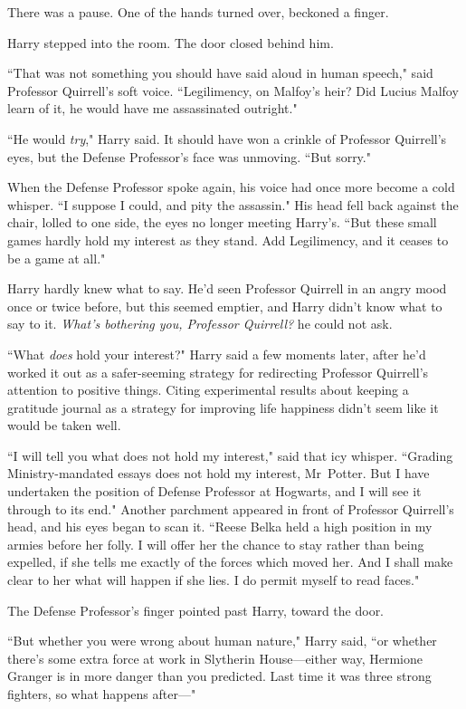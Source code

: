 There was a pause. One of the hands turned over, beckoned a finger.

Harry stepped into the room. The door closed behind him.

``That was not something you should have said aloud in human speech," said Professor Quirrell's soft voice. ``Legilimency, on Malfoy's heir? Did Lucius Malfoy learn of it, he would have me assassinated outright."

``He would \emph{try}," Harry said. It should have won a crinkle of Professor Quirrell's eyes, but the Defense Professor's face was unmoving. ``But sorry."

When the Defense Professor spoke again, his voice had once more become a cold whisper. ``I suppose I could, and pity the assassin." His head fell back against the chair, lolled to one side, the eyes no longer meeting Harry's. ``But these small games hardly hold my interest as they stand. Add Legilimency, and it ceases to be a game at all."

Harry hardly knew what to say. He'd seen Professor Quirrell in an angry mood once or twice before, but this seemed emptier, and Harry didn't know what to say to it. \emph{What's bothering you, Professor Quirrell?} he could not ask.

``What \emph{does} hold your interest?" Harry said a few moments later, after he'd worked it out as a safer-seeming strategy for redirecting Professor Quirrell's attention to positive things. Citing experimental results about keeping a gratitude journal as a strategy for improving life happiness didn't seem like it would be taken well.

``I will tell you what does not hold my interest," said that icy whisper. ``Grading Ministry-mandated essays does not hold my interest, Mr~Potter. But I have undertaken the position of Defense Professor at Hogwarts, and I will see it through to its end." Another parchment appeared in front of Professor Quirrell's head, and his eyes began to scan it. ``Reese Belka held a high position in my armies before her folly. I will offer her the chance to stay rather than being expelled, if she tells me exactly of the forces which moved her. And I shall make clear to her what will happen if she lies. I do permit myself to read faces."

The Defense Professor's finger pointed past Harry, toward the door.

``But whether you were wrong about human nature," Harry said, ``or whether there's some extra force at work in Slytherin House—either way, Hermione Granger is in more danger than you predicted. Last time it was three strong fighters, so what happens after—"

